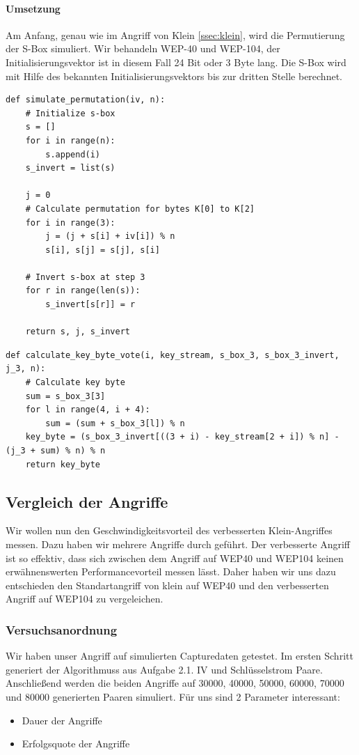 \documentclass[10pt,a4paper]{article}
\begin{document}
\paragraph{Umsetzung}
Am Anfang, genau wie im Angriff von Klein \ref{ssec:klein}, wird die Permutierung der S-Box simuliert. Wir behandeln WEP-40 und WEP-104, der Initialisierungsvektor ist in diesem Fall 24 Bit oder 3 Byte lang. Die S-Box wird mit Hilfe des bekannten Initialisierungsvektors bis zur dritten Stelle berechnet.
\begin{lstlisting}
def simulate_permutation(iv, n):
    # Initialize s-box
    s = []
    for i in range(n):
        s.append(i)
    s_invert = list(s)

    j = 0
    # Calculate permutation for bytes K[0] to K[2]
    for i in range(3):
        j = (j + s[i] + iv[i]) % n
        s[i], s[j] = s[j], s[i]

    # Invert s-box at step 3
    for r in range(len(s)):
        s_invert[s[r]] = r

    return s, j, s_invert
\end{lstlisting}
\begin{lstlisting}
def calculate_key_byte_vote(i, key_stream, s_box_3, s_box_3_invert, j_3, n):
    # Calculate key byte
    sum = s_box_3[3]
    for l in range(4, i + 4):
        sum = (sum + s_box_3[l]) % n
    key_byte = (s_box_3_invert[((3 + i) - key_stream[2 + i]) % n] - (j_3 + sum) % n) % n
    return key_byte
\end{lstlisting}

\subsection{Vergleich der Angriffe}
\label{subsec:vergleich}
Wir wollen nun den Geschwindigkeitsvorteil des verbesserten Klein-Angriffes messen. Dazu haben wir mehrere Angriffe durch geführt. Der verbesserte Angriff ist so effektiv, dass sich zwischen dem Angriff auf WEP40 und WEP104 keinen erwähnenswerten Performancevorteil messen lässt. Daher haben wir uns dazu entschieden den Standartangriff von klein auf WEP40 und den verbesserten Angriff auf WEP104 zu vergeleichen.


\subsubsection{Versuchsanordnung}
Wir haben unser Angriff auf simulierten Capturedaten getestet. Im ersten Schritt generiert der Algorithmuss aus Aufgabe 2.1. IV und Schlüsselstrom Paare. Anschließend werden die beiden Angriffe auf 30000, 40000, 50000, 60000, 70000 und 80000 generierten Paaren simuliert. Für uns sind 2 Parameter interessant: 
\begin{itemize}
	\item Dauer der Angriffe
	\item Erfolgsquote der Angriffe
\end{itemize}
\end{document}
